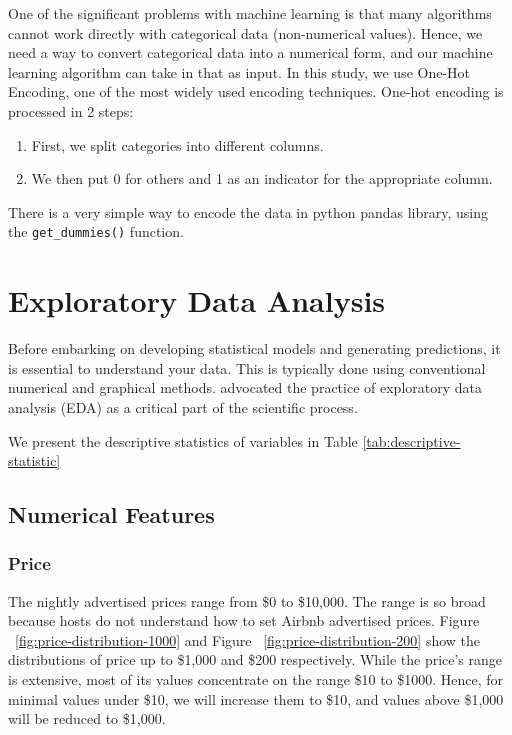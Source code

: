 One of the significant problems with machine learning is that many algorithms
cannot work directly with categorical data (non-numerical values).  Hence, we
need a way to convert categorical data into a numerical form, and our machine
learning algorithm can take in that as input. In this study, we use  One-Hot
Encoding, one of the most widely used encoding techniques.  One-hot encoding is
processed in 2 steps:
\begin{enumerate}
    \item First, we split categories into different columns.
    \item We then put 0 for others and 1 as an indicator for the appropriate column.
\end{enumerate}

There is a very simple way to encode the data in python pandas library, using
the \texttt{get\_dummies()} function.

\section{Exploratory Data Analysis}

Before embarking on developing statistical models and generating predictions, it
is essential to understand your data. This is typically done using conventional
numerical and graphical methods. \textcite{tukey1977exploratory} advocated the practice
of exploratory data analysis (EDA) as a critical part of the scientific process.

We present the descriptive statistics of variables in Table
\ref{tab:descriptive-statistic}

\subsection{Numerical Features}
\label{sec:numerical_features}

\subsubsection*{Price}

The nightly advertised prices range from \$0 to \$10,000. The range is so broad
because hosts do not understand how to set Airbnb advertised prices.  Figure
~\ref{fig:price-distribution-1000} and Figure ~\ref{fig:price-distribution-200}
 show the distributions of price up to \$1,000 and \$200 respectively. While the
price's range is extensive, most of its values concentrate on the range \$10 to
\$1000.  Hence, for minimal values under \$10, we will increase them to \$10,
and values above \$1,000 will be reduced to \$1,000.

